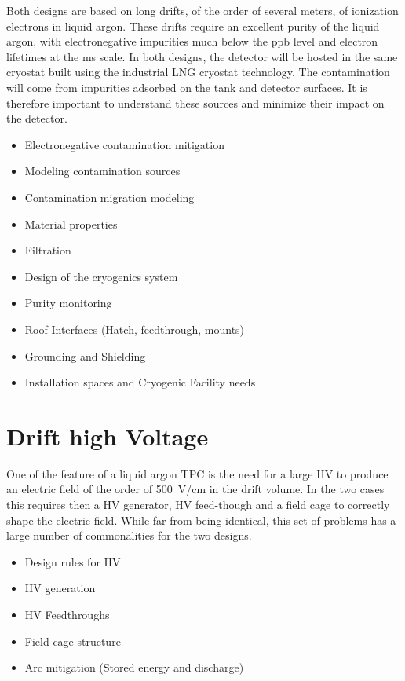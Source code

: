 Both designs are based on long drifts, of the order of several meters,
of ionization electrons in liquid argon. These drifts require an
excellent purity of the liquid argon, with electronegative impurities
much below the ppb level and electron lifetimes at the ms scale. In
both designs, the detector will be hosted in the same cryostat built
using the industrial LNG cryostat technology. The contamination will
come from impurities adsorbed on the tank and detector surfaces. It is
therefore important to understand these sources and minimize their
impact on the detector.
\begin{itemize}
\item Electronegative contamination mitigation	
\item Modeling contamination sources
\item Contamination migration modeling
\item Material properties
\item Filtration	
\item Design of the cryogenics system
\item Purity monitoring	
\item Roof Interfaces (Hatch, feedthrough, mounts)	
\item Grounding	and Shielding
\item Installation spaces and Cryogenic Facility needs	
\end{itemize}

\section{Drift high Voltage}

One of the feature of a liquid argon TPC is the need for a large HV to
produce an electric field of the order of 500~V/cm in the drift
volume.  In the two cases this requires then a HV generator, HV
feed-though and a field cage to correctly shape the electric
field. While far from being identical, this set of problems has a
large number of commonalities for the two designs.
\begin{itemize}
\item Design rules for HV
\item HV generation
\item HV Feedthroughs
\item Field cage structure
\item Arc mitigation (Stored energy and discharge)
\end{itemize}


